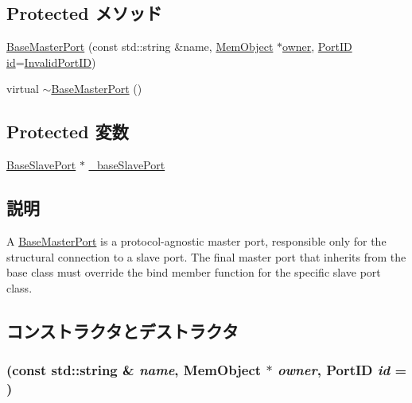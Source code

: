 \subsection*{Protected メソッド}
\begin{DoxyCompactItemize}
\item 
\hyperlink{classBaseMasterPort_ac7ad9c573dec4e547b3c45154b965d55}{BaseMasterPort} (const std::string \&name, \hyperlink{classMemObject}{MemObject} $\ast$\hyperlink{classPort_aba966efb6c1df4b015be3a396df6c318}{owner}, \hyperlink{base_2types_8hh_acef4d7d41cb21fdc252e20c04cd7bb8e}{PortID} \hyperlink{classPort_a0a67444fc1c33a60fe4a92bfff05d0cb}{id}=\hyperlink{base_2types_8hh_a65bf40f138cf863f0c5e2d8ca1144126}{InvalidPortID})
\item 
virtual \hyperlink{classBaseMasterPort_a078b3172e1cb6a5dd1b1608a051ee38b}{$\sim$BaseMasterPort} ()
\end{DoxyCompactItemize}
\subsection*{Protected 変数}
\begin{DoxyCompactItemize}
\item 
\hyperlink{classBaseSlavePort}{BaseSlavePort} $\ast$ \hyperlink{classBaseMasterPort_a5b9273661ccc0128fc9505529741c91d}{\_\-baseSlavePort}
\end{DoxyCompactItemize}


\subsection{説明}
A \hyperlink{classBaseMasterPort}{BaseMasterPort} is a protocol-\/agnostic master port, responsible only for the structural connection to a slave port. The final master port that inherits from the base class must override the bind member function for the specific slave port class. 

\subsection{コンストラクタとデストラクタ}
\hypertarget{classBaseMasterPort_ac7ad9c573dec4e547b3c45154b965d55}{
\subsubsection[{BaseMasterPort}]{ (const std::string \& {\em name}, \/  {\bf MemObject} $\ast$ {\em owner}, \/  {\bf PortID} {\em id} = {})}}
\label{classBaseMasterPort_ac7ad9c573dec4e547b3c45154b965d55}



